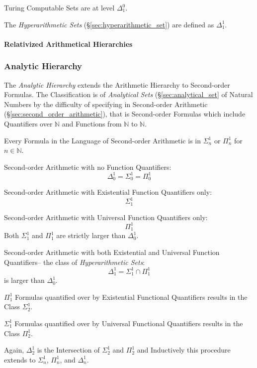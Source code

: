 Turing Computable Sets are at level $\Delta^0_1$.

The \emph{Hyperarithmetic Sets} (\S\ref{sec:hyperarithmetic_set})
are defined as $\Delta^1_1$.

\paragraph{Relativized Arithmetical Hierarchies}\hfill



\subsubsection{Analytic Hierarchy}\label{sec:analytic_hierarchy}

The \emph{Analytic Hierarchy} extends the Arithmetic Hierarchy to
Second-order Formulas. The Classification is of \emph{Analytical Sets}
(\S\ref{sec:analytical_set} of Natural Numbers by the difficulty of
specifying in Second-order Arithmetic
(\S\ref{sec:second_order_arithmetic}), that is Second-order Formulas which
include Quantifiers over $\mathbb{N}$ and Functions from $\mathbb{N}$
to $\mathbb{N}$.

Every Formula in the Language of Second-order Arithmetic is in
$\Sigma^1_n$ or $\Pi^1_n$ for $n \in \mathbb{N}$.

Second-order Arithmetic with no Function Quantifiers:
\[
  \Delta^1_0 = \Sigma^1_0 = \Pi^1_0
\]

Second-order Arithmetic with Existential Function Quantifiers only:
\[
  \Sigma^1_1
\]

Second-order Arithmetic with Universal Function Quantifiers only:
\[
  \Pi^1_1
\]
Both $\Sigma^1_1$ and $\Pi^1_1$ are strictly larger than $\Delta^1_0$.

Second-order Arithmetic with both Existential and Universal Function
Quantifiers-- the class of \emph{Hyperarithmetic Sets}:
\[
  \Delta^1_1 = \Sigma^1_1 \cap \Pi^1_1
\]
is larger than $\Delta^1_0$.

$\Pi^1_1$ Formulas quantified over by Existential Functional
Quantifiers results in the Class $\Sigma^1_2$.

$\Sigma^1_1$ Formulas quantified over by Universal Functional
Quantifiers results in the Class $\Pi^1_2$.

Again, $\Delta^1_2$ is the Intersection of $\Sigma^1_2$ and $\Pi^1_2$
and Inductively this procedure extends to $\Sigma^1_n$, $\Pi^1_n$, and
$\Delta^1_n$.



